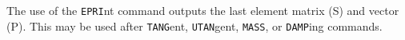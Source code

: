 \headb

The use of the {\tt EPRI}nt command outputs the last
element matrix (S) and vector (P).  This may be used after
{\tt TANG}ent, {\tt UTAN}gent, {\tt MASS}, or {\tt DAMP}ing commands.
\vfill\eject

